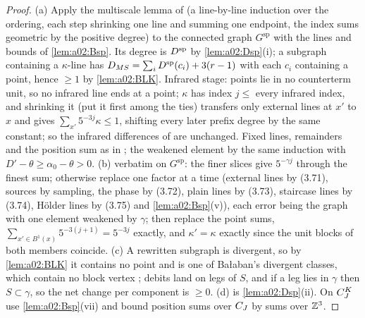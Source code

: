 \begin{proof}
(a) Apply the multiscale lemma of \cite[(3.66)--(3.70)]{K1} (a line-by-line induction over the ordering, each step shrinking one line and summing one endpoint, the index sums geometric by the positive degree) to the connected graph $G^{\mathrm{sp}}$ with the lines and bounds of \cref{lem:a02:Bsp}. Its degree is $D^{\mathrm{sp}}$ by \cref{lem:a02:Dsp}(i); a subgraph containing a $\kappa$-line has $D_{MS}=\sum_iD^{\mathrm{sp}}(c_i)+3(r-1)$ with each $c_i$ containing a point, hence $\ge1$ by \cref{lem:a02:BLK}. Infrared stage: points lie in no counterterm unit, so no infrared line ends at a point; $\kappa$ has index $j\le$ every infrared index, and shrinking it (put it first among the ties) transfers only external lines at $x'$ to $x$ and gives $\sum_{x'}5^{-3j}\kappa\le1$, shifting every later prefix degree by the same constant; so the infrared differences of \cite[(3.80)]{K1} are unchanged. Fixed lines, remainders and the position sum as in \cite[pp.~663--664]{K1}; the weakened element by the same induction with $D'-\theta\ge\alpha_0-\theta>0$. (b) \cite[pp.~663--665]{K1} verbatim on $G^{\mathrm{sp}}$: the finer slices give $5^{-\gamma j}$ through the finest sum; otherwise replace one factor at a time (external lines by (3.71), sources by sampling, the phase by (3.72), plain lines by (3.73), staircase lines by (3.74), H\"older lines by (3.75) and \cref{lem:a02:Bsp}(v)), each error being the graph with one element weakened by $\gamma$; then replace the point sums, $\sum_{x'\in B^1(x)}5^{-3(j+1)}=5^{-3j}$ exactly, and $\kappa'=\kappa$ exactly since the unit blocks of both members coincide. (c) A rewritten subgraph is divergent, so by \cref{lem:a02:BLK} it contains no point and is one of Ba{\l}aban's divergent classes, which contain no block vertex \cite[pp.~428--431]{Ba3}; debits land on legs of $S$, and if a leg lies in $\gamma$ then $S\subset\gamma$, so the net change per component is $\ge0$. (d) is \cref{lem:a02:Dsp}(ii). On $C^{K}_{J}$ use \cref{lem:a02:Bsp}(vii) and bound position sums over $C_J$ by sums over $\mathbb Z^3$.
\end{proof}

